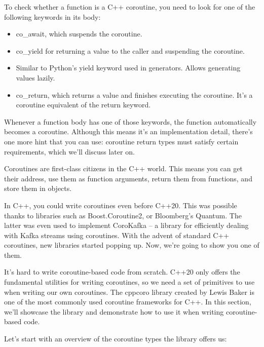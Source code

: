To check whether a function is a C++ coroutine, you need to look for one of the following keywords in its body:

\begin{itemize}
\item 
co\_await, which suspends the coroutine.

\item 
co\_yield for returning a value to the caller and suspending the coroutine.

\item 
Similar to Python's yield keyword used in generators. Allows generating values lazily.

\item 
co\_return, which returns a value and finishes executing the coroutine. It's a coroutine equivalent of the return keyword.
\end{itemize}

Whenever a function body has one of those keywords, the function automatically becomes a coroutine. Although this means it's an implementation detail, there's one more hint that you can use: coroutine return types must satisfy certain requirements, which we'll discuss later on.

Coroutines are first-class citizens in the C++ world. This means you can get their address, use them as function arguments, return them from functions, and store them in objects.

In C++, you could write coroutines even before C++20. This was possible thanks to libraries such as Boost.Coroutine2, or Bloomberg's Quantum. The latter was even used to implement CoroKafka – a library for efficiently dealing with Kafka streams using coroutines. With the advent of standard C++ coroutines, new libraries started popping up. Now, we're going to show you one of them.


It's hard to write coroutine-based code from scratch. C++20 only offers the fundamental utilities for writing coroutines, so we need a set of primitives to use when writing our own coroutines. The cppcoro library created by Lewis Baker is one of the most commonly used coroutine frameworks for C++. In this section, we'll showcase the library and demonstrate how to use it when writing coroutine-based code.

Let's start with an overview of the coroutine types the library offers us:

